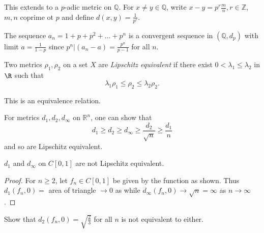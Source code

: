 \documentclass[a4paper]{article}
\begin{document}
This extends to a $p$-adic metric on $\mathbb{Q}$. For $x\neq y \in \mathbb{Q}$, write $x-y = p^r \frac{m}{n}, r\in\mathbb{Z}$, $m, n$ coprime ot $p$ and define $d(x,y) = \frac{1}{p^r}$.

\begin{ex}
  The sequence $a_n = 1+p+p^2+ \dots + p^n$ is a convergent sequence in $(\mathbb{Q},d_p)$ with limit $a = \frac{1}{1-p}$ since $p^n | (a_n-a) = \frac{p^n}{p-1}$ for all $n$.
\end{ex}

\begin{definition}
  Two metrics $\rho_1, \rho_2$ on a set $X$ are \emph{Lipschitz equivalent} if there exist \(0 < \lambda_1 \leq \lambda_2\) in \(\R\) such that
  \[
    \lambda_1 \rho_1 \leq \rho_2 \leq \lambda_2\rho_2.
  \]
\end{definition}

This is an equivalence relation.

\begin{remark}
  For metrics $d_1, d_2, d_\infty$ on $\mathbb{R}^n$, one can show that
  \[
    d_1 \geq d_2 \geq d_\infty \geq \frac{d_2}{\sqrt n} \geq \frac{d_1}{n}
  \]
  and so are Lipschitz equivalent.
\end{remark}

\begin{proposition}
  $d_1$ and $d_\infty$ on $C[0,1]$ are not Lipschitz equivalent.
\end{proposition}

\begin{proof}
  For $n \geq 2$, let $f_n \in C[0,1]$ be given by the function as shown. Thus $d_1(f_n,0) =$ area of triangle $\to 0$ as while $d_\infty(f_n,0) \to \sqrt n = \infty$ as $n \to \infty$.
\end{proof}

\begin{center}
\end{center}

\begin{ex}
  Show that $d_2(f_n,0) = \sqrt{\frac{2}{3}}$ for all $n$ is not equivalent to either.
\end{ex}
\end{document}
